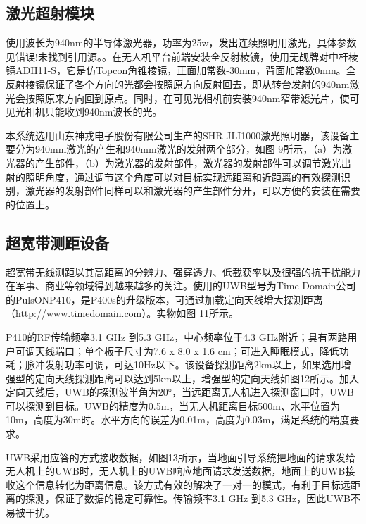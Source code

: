 \subsection{激光超射模块}
使用波长为940nm的半导体激光器，功率为25w，发出连续照明用激光，具体参数见错误!未找到引用源。。在无人机平台前端安装全反射棱镜，使用无觇牌对中杆棱镜ADH11-S，它是仿Topcon角锥棱镜，正面加常数-30mm，背面加常数0mm。全反射棱镜保证了各个方向的光都会按照原方向反射回去，即从转台发射的940nm激光会按照原来方向回到原点。同时，在可见光相机前安装940nm窄带滤光片，使可见光相机只能收到940nm波长的光。

本系统选用山东神戎电子股份有限公司生产的SHR-JLI1000激光照明器，该设备主要分为940mm激光的产生和940mm激光的发射两个部分，如图 9所示，（a）为激光器的产生部件，（b）为激光器的发射部件，激光器的发射部件可以调节激光出射的照明角度，通过调节这个角度可以对目标实现远距离和近距离的有效探测识别，激光器的发射部件同样可以和激光器的产生部件分开，可以方便的安装在需要的位置上。

\subsection{超宽带测距设备}
超宽带无线测距以其高距离的分辨力、强穿透力、低截获率以及很强的抗干扰能力在军事、商业等领域得到越来越多的关注。使用的UWB型号为Time Domain公司的PulsONP410，是P400s的升级版本，可通过加载定向天线增大探测距离（http://www.timedomain.com）。实物如图 11所示。

P410的RF传输频率3.1 GHz 到5.3 GHz，中心频率位于4.3 GHz附近；具有两路用户可调天线端口；单个板子尺寸为7.6 x 8.0 x 1.6 cm；可进入睡眠模式，降低功耗；脉冲发射功率可调，可达10Hz以下。该设备探测距离2km以上，如果选用增强型的定向天线探测距离可以达到5km以上，增强型的定向天线如图12所示。加入定向天线后，UWB的探测波半角为20°，当远距离无人机进入探测窗口时，UWB可以探测到目标。UWB的精度为0.5m，当无人机距离目标500m、水平位置为10m，高度为30m时。水平方向的误差为0.01m，高度为0.03m，满足系统的精度要求。

UWB采用应答的方式接收数据，如图13所示，当地面引导系统把地面的请求发给无人机上的UWB时，无人机上的UWB响应地面请求发送数据，地面上的UWB接收这个信息转化为距离信息。该方式有效的解决了一对一的模式，有利于目标远距离的探测，保证了数据的稳定可靠性。传输频率3.1 GHz 到5.3 GHz，因此UWB不易被干扰。
